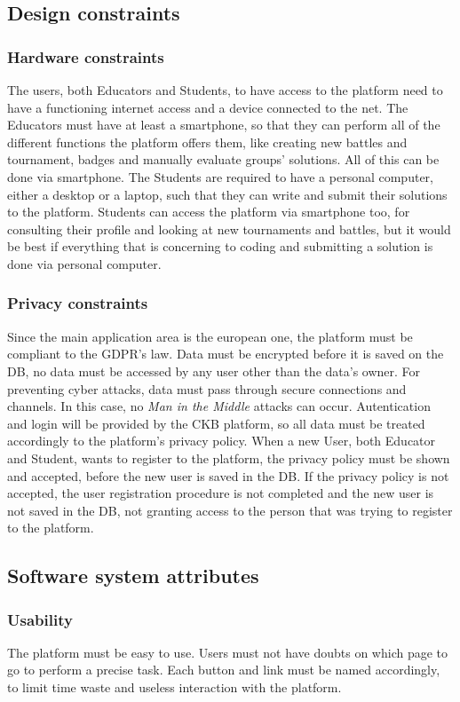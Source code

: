 \documentclass{article}
\begin{document}
{\subsection{Design constraints}
\subsubsection{Hardware constraints}
The users, both Educators and Students, to have access to the platform need to have a functioning internet access and a device connected to the net.
The Educators must have at least a smartphone, so that they can perform all of the different functions the platform offers them, like creating new battles
and tournament, badges and manually evaluate groups' solutions. All of this can be done via smartphone.
The Students are required to have a personal computer, either a desktop or a laptop, such that they can write and submit their solutions to the platform.
Students can access the platform via smartphone too, for consulting their profile and looking at new tournaments and battles, but it would be
best if everything that is concerning to coding and submitting a solution is done via personal computer.
\subsubsection{Privacy constraints}
Since the main application area is the european one, the platform must be compliant to the GDPR's law.
Data must be encrypted before it is saved on the DB, no data must be accessed by any user other than the data's owner.
For preventing cyber attacks, data must pass through secure connections and channels. In this case, no \textit{Man in the Middle} attacks can occur.
Autentication and login will be provided by the CKB platform, so all data must be treated accordingly to the platform's privacy policy.
When a new User, both Educator and Student, wants to register to the platform, the privacy policy must be shown and accepted, before the new user is saved in the DB.
If the privacy policy is not accepted, the user registration procedure is not completed and the new user is not saved in the DB, not granting access to the person that was
trying to register to the platform.
\subsection{Software system attributes}
\subsubsection{Usability}
The platform must be easy to use. Users must not have doubts on which page to go to perform a precise task.
Each button and link must be named accordingly, to limit time waste and useless interaction with the platform.
}
\end{document}
